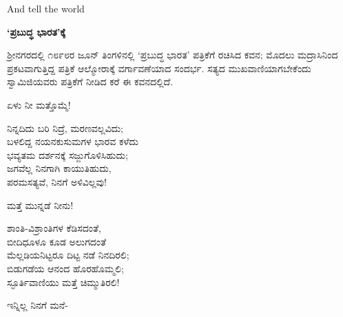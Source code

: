 And tell the world

\begin{myquote}
\end{myquote}

\selectkan

\begin{center}
\textbf{‘ಪ್ರಬುದ್ಧ ಭಾರತ’ಕ್ಕೆ}
\end{center}

ಶ‍್ರೀನಗರದಲ್ಲಿ ೧೮೯೮ರ ಜೂನ್ ತಿಂಗಳಿನಲ್ಲಿ ‘ಪ್ರಬುದ್ಧ ಭಾರತ’ ಪತ್ರಿಕೆಗೆ ರಚಿಸಿದ ಕವನ; ಮೊದಲು ಮದ್ರಾಸಿನಿಂದ ಪ್ರಕಟವಾಗುತ್ತಿದ್ದ ಪತ್ರಿಕೆ ಆಲ್ಮೋರಾಕ್ಕೆ ವರ್ಗಾವಣೆಯಾದ ಸಂದರ್ಭ. ಸತ್ಯದ ಮುಖವಾಣಿಯಾಗಬೇಕೆಂದು ಸ್ವಾಮಿಜಿಯವರು ಪತ್ರಿಕೆಗೆ ನೀಡಿದ ಕರೆ ಈ ಕವನದಲ್ಲಿದೆ.

ಏಳು ನೀ ಮತ್ತೊಮ್ಮೆ!

\begin{myquote}
ನಿನ್ನದಿದು ಬರಿ ನಿದ್ರೆ, ಮರಣವಲ್ಲವಿದು;\\ಬಳಲಿದ್ದ ನಯನಕುಸುಮಗಳ ಭಾರವ ಕಳೆದು\\ಭವ್ಯತಮ ದರ್ಶನಕ್ಕೆ ಸಜ್ಜುಗೊಳಿಸಿಹುದು;\\ಜಗವೆಲ್ಲ ನಿನಗಾಗಿ ಕಾಯುತಿಹುದು,\\ಪರಮಸತ್ಯವೆ, ನಿನಗೆ ಅಳಿವಿಲ್ಲವು!
\end{myquote}

ಮತ್ತೆ ಮುನ್ನಡೆ ನೀನು!

\begin{myquote}
ಶಾಂತಿ-ವಿಶ್ರಾಂತಿಗಳ ಕೆಡಿಸದಂತೆ,\\ಬೀದಿಧೂಳೂ ಕೂಡ ಅಲುಗದಂತೆ\\ಮೆಲ್ಲಡಿಯನಿಟ್ಟರೂ ದಿಟ್ಟ ನಡೆ ನಿನದಿರಲಿ;\\ಬಿಡುಗಡೆಯ ಆನಂದ ಹೊರಹೊಮ್ಮಲಿ;\\ಸ್ಫೂರ್ತಿವಾಣಿಯು ಮತ್ತೆ ಚಿಮ್ಮುತಿರಲಿ!
\end{myquote}

ಇನ್ನಿಲ್ಲ ನಿನಗೆ ಮನೆ-

